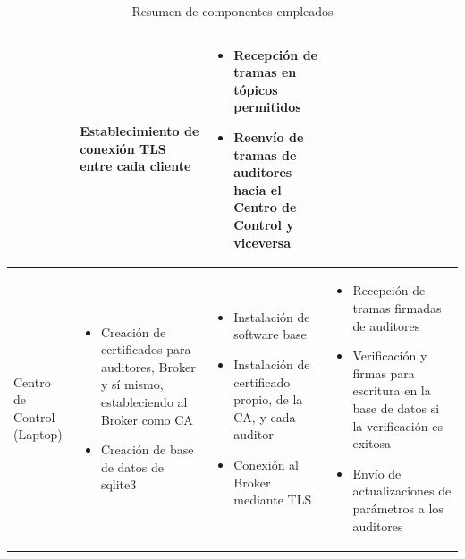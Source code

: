 \documentclass{article}
\begin{document}
\begin{table}[htbp]
{\begin{tabular}{ | m{2cm} | m{4cm} | m{4cm} | m{8cm} | }
\begin{itemize}[noitemsep, leftmargin=*]
                    \end{itemize} &
                    Establecimiento de conexión TLS entre cada cliente &
                    \begin{itemize}[noitemsep, leftmargin=*]
                        \item Recepción de tramas en tópicos permitidos
                        \item Reenvío de tramas de auditores hacia el Centro de Control y viceversa
                    \end{itemize} \\
                    \hline
                    Centro de Control (Laptop) &
                    \begin{itemize}[noitemsep, leftmargin=*]
                        \item Creación de certificados para auditores, Broker y sí mismo, estableciendo al Broker como CA
                        \item Creación de base de datos de sqlite3
                    \end{itemize} &
                    \begin{itemize}[noitemsep, leftmargin=*]
                        \item Instalación de software base
                        \item Instalación de certificado propio, de la CA, y cada auditor
                        \item Conexión al Broker mediante TLS
                    \end{itemize} &
                    \begin{itemize}[noitemsep, leftmargin=*]
                        \item Recepción de tramas firmadas de auditores
                        \item Verificación y firmas para escritura en la base de datos si la verificación es exitosa
                        \item Envío de actualizaciones de parámetros a los auditores
                    \end{itemize} \\
                    \hline
                \end{tabular}}
                \caption{Resumen de componentes empleados}
                \label{tab:component_summary}
            \end{table}
\end{document}
